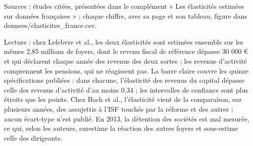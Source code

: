 Sources : études citées, présentées dans le complément « Les élasticités estimées sur données françaises » ; chaque chiffre, avec sa page et son tableau, figure dans donnees/elasticites\_france.csv.\par Lecture : chez Lefebvre et al., les deux élasticités sont estimées ensemble sur les mêmes 2,85 millions de foyers, dont le revenu fiscal de référence dépasse 30 000 \euro{} et qui déclarent chaque année des revenus des deux sortes ; les revenus d'activité comprennent les pensions, qui ne réagissent pas. La barre claire couvre les quinze spécifications publiées : dans chacune, l'élasticité des revenus du capital dépasse celle des revenus d'activité d'au moins 0,34 ; les intervalles de confiance sont plus étroits que les points. Chez Bach et al., l'élasticité vient de la comparaison, sur plusieurs années, des assujettis à l'ISF touchés par la réforme et des autres ; aucun écart-type n'est publié. En 2013, la détention des sociétés est mal mesurée, ce qui, selon les auteurs, surestime la réaction des autres foyers et sous-estime celle des dirigeants.
